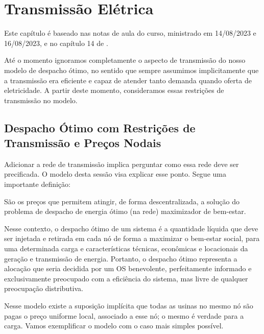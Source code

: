 \chapter{Transmissão Elétrica}
\localtableofcontents 

Este capítulo é baseado nas notas de aula do curso, ministrado em 14/08/2023 e 16/08/2023, e no capítulo 14 de \textcite{cretì_fontini_2019}.

Até o momento ignoramos completamente o aspecto de transmissão do nosso modelo de despacho ótimo, no sentido que sempre assumimos implicitamente que a transmissão era eficiente e capaz de atender tanto demanda quando oferta de eletricidade. A partir deste momento, consideramos essas restrições de transmissão no modelo.

\section{Despacho Ótimo com Restrições de Transmissão e Preços Nodais}
Adicionar a rede de transmissão implica perguntar como essa rede deve ser precificada. O modelo desta sessão visa explicar esse ponto. Segue uma importante definição:
\begin{defin}
    São os preços que permitem atingir, de forma descentralizada, a solução do problema de despacho de energia ótimo (na rede) maximizador de bem-estar.
\end{defin}

 Nesse contexto, o despacho ótimo de um sistema é a quantidade líquida que deve ser injetada e retirada em cada nó de forma a maximizar o bem-estar social, para uma determinada carga e características técnicas, econômicas e locacionais da geração e transmissão de energia. Portanto, o despacho ótimo representa a alocação que seria decidida por um OS benevolente, perfeitamente informado e exclusivamente preocupado com a eficiência do sistema, mas livre de qualquer preocupação distributiva.

Nesse modelo existe a suposição implícita que todas as usinas no
mesmo nó são pagas o preço uniforme local, associado a esse nó; o mesmo é verdade para a carga. Vamos exemplificar o modelo com o caso mais simples possível.

